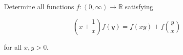 Determine all functions $f: (0, \infty) \to \mathbb{R}$ satisfying

$$\left( x + \frac{1}{x} \right) f(y) = f(xy) + f\left(\frac{y}{x}\right)$$

for all $x, y > 0$.